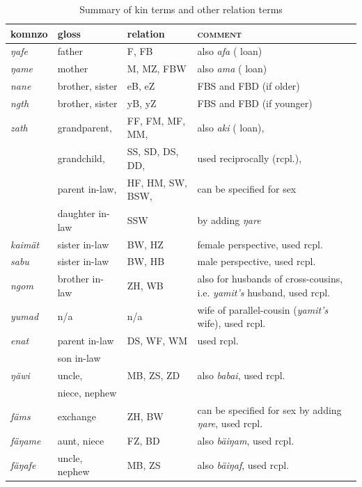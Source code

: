 \renewcommand{\tabcolsep}{2,3pt}
\begin{table}
\caption{Summary of kin terms and other relation terms}
\begin{tabularx}{\textwidth}{llp{3cm}Q}
\label{kintermstable}\\
		\lsptoprule
		{komnzo} & {gloss}&{relation} & \textsc{comment}\\\midrule
		\emph{ŋafe} & father & F, FB & also \emph{afa} ( loan)\\
		\emph{ŋame} & mother & M, MZ, FBW & also \emph{ama} ( loan)\\
		\emph{nane} & brother, sister & eB, eZ & FBS and FBD (if older)\\
		\emph{ngth} & brother, sister & yB, yZ & FBS and FBD (if younger)\\
		\emph{zath} & grandparent,&FF, FM, MF, MM, & also \emph{aki} ( loan),\\
		&grandchild,&SS, SD, DS, DD, &used reciprocally (rcpl.), \\
		&parent in-law,&HF, HM, SW, BSW, &can be specified for sex\\
		&daughter in-law&SSW &by adding \emph{ŋare}\\
		\emph{kaimät} & sister in-law & BW, HZ & female perspective, used rcpl.\\
		\emph{sabu} & sister in-law & BW, HB & male perspective, used rcpl.\\
		\emph{ngom} & brother in-law & ZH, WB & also for husbands of cross-cousins, i.e. \emph{yamit's} husband, used rcpl.\\
		\emph{yumad} & n/a & n/a & wife of parallel-cousin (\emph{yamit's} wife), used rcpl.\\
		\emph{enat} &parent in-law& DS, WF, WM&used rcpl.\\
		&son in-law&&\\
		\emph{ŋäwi} & uncle,& MB, ZS, ZD	& also \emph{babai}, used rcpl.\\
		&niece, nephew&&\\
		\emph{fäms} & exchange	& ZH, BW & can be specified for sex by adding \emph{ŋare}, used rcpl.\\
		\emph{fäŋame} & aunt, niece & FZ, BD&also \emph{bäiŋam}, used rcpl.\\
		\emph{fäŋafe} & uncle, nephew & MB, ZS&also \emph{bäiŋaf}, used rcpl.\\

\end{tabularx}
\end{table}
